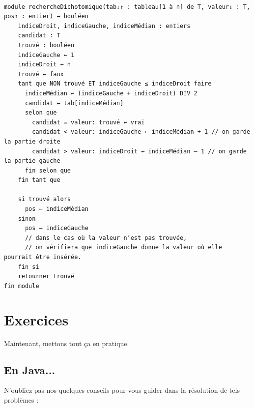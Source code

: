 \documentclass[11pt,a4paper]{article}
\begin{document}
            \par
        \begin{verbatim}

module rechercheDichotomique(tab↓↑ : tableau[1 à n] de T, valeur↓ : T, pos↑ : entier) → booléen
    indiceDroit, indiceGauche, indiceMédian : entiers
    candidat : T
    trouvé : booléen
    indiceGauche ← 1
    indiceDroit ← n
    trouvé ← faux
    tant que NON trouvé ET indiceGauche ≤ indiceDroit faire
      indiceMédian ← (indiceGauche + indiceDroit) DIV 2
      candidat ← tab[indiceMédian]
      selon que
        candidat = valeur: trouvé ← vrai
        candidat < valeur: indiceGauche ← indiceMédian + 1 // on garde la partie droite
        candidat > valeur: indiceDroit ← indiceMédian – 1 // on garde la partie gauche
      fin selon que
    fin tant que
    
    si trouvé alors
      pos ← indiceMédian
    sinon
      pos ← indiceGauche
      // dans le cas où la valeur n’est pas trouvée,
      // on vérifiera que indiceGauche donne la valeur où elle pourrait être insérée.
    fin si
    retourner trouvé
fin module
\end{verbatim}\section{Exercices}
				Maintenant, mettons tout \c ca en pratique.
      
            \par
        \subsection{En Java...}
        N'oubliez pas nos quelques conseils pour vous guider dans la r\'esolution de tels probl\`emes :
        
\end{document}

